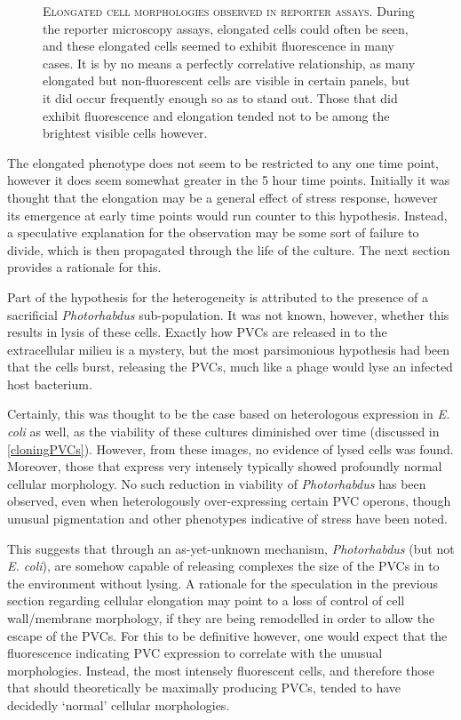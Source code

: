 \begin{figure}[p]
\captionsetup{singlelinecheck=off, justification=justified, font=footnotesize, aboveskip=10pt}
\caption[Elongated cellular morphologies observed in reporter microscopy]{\textsc{\normalsize Elongated cell morphologies observed in reporter assays.} \vspace{0.1cm} \newline During the reporter microscopy assays, elongated cells could often be seen, and these elongated cells seemed to exhibit fluorescence in many cases. It is by no means a perfectly correlative relationship, as many elongated but non-fluorescent cells are visible in certain panels, but it did occur frequently enough so as to stand out. Those that did exhibit fluorescence and elongation tended not to be among the brightest visible cells however. }
\label{elongating}
\end{figure}

The elongated phenotype does not seem to be restricted to any one time point, however it does seem somewhat greater in the 5 hour time points. Initially it was thought that the elongation may be a general effect of stress response, however its emergence at early time points would run counter to this hypothesis. Instead, a speculative explanation for the observation may be some sort of failure to divide, which is then propagated through the life of the culture. The next section provides a rationale for this.


Part of the hypothesis for the heterogeneity is attributed to the presence of a sacrificial \emph{Photorhabdus} sub-population. It was not known, however, whether this results in lysis of these cells. Exactly how PVCs are released in to the extracellular milieu is a mystery, but the most parsimonious hypothesis had been that the cells burst, releasing the PVCs, much like a phage would lyse an infected host bacterium.

Certainly, this was thought to be the case based on heterologous expression in \emph{E. coli} as well, as the viability of these cultures diminished over time (discussed in \vref{cloningPVCs}). However, from these images, no evidence of lysed cells was found. Moreover, those that express very intensely typically showed profoundly normal cellular morphology. No such reduction in viability of \emph{Photorhabdus} has been observed, even when heterologously over-expressing certain PVC operons, though unusual pigmentation and other phenotypes indicative of stress have been noted.

This suggests that through an as-yet-unknown mechanism, \emph{Photorhabdus} (but not \emph{E. coli}), are somehow capable of releasing complexes the size of the PVCs in to the environment without lysing. A rationale for the speculation in the previous section regarding cellular elongation may point to a loss of control of cell wall/membrane morphology, if they are being remodelled in order to allow the escape of the PVCs. For this to be definitive however, one would expect that the fluorescence indicating PVC expression to correlate with the unusual morphologies. Instead, the most intensely fluorescent cells, and therefore those that should theoretically be maximally producing PVCs, tended to have decidedly `normal' cellular morphologies.

